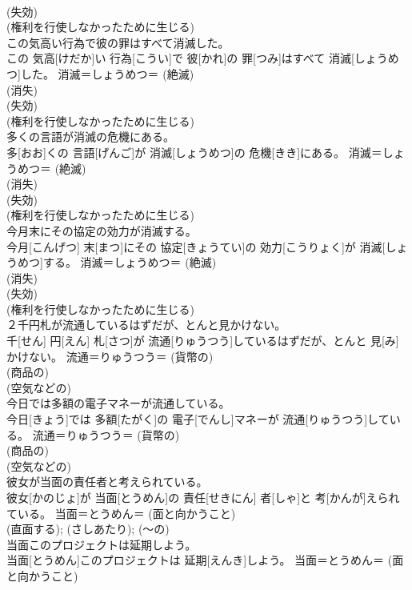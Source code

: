 \documentclass[8pt]{extreport}
\begin{document}
\begin{CJK}{UTF8}{min}
{\\	(失効) 
\\	(権利を行使しなかったために生じる) 
\\	この気高い行為で彼の罪はすべて消滅した。	
\\	この 気高[けだか]い 行為[こうい]で 彼[かれ]の 罪[つみ]はすべて 消滅[しょうめつ]した。	消滅＝しょうめつ＝ (絶滅) 
\\	(消失) 
\\	(失効) 
\\	(権利を行使しなかったために生じる) 
\\	多くの言語が消滅の危機にある。	
\\	多[おお]くの 言語[げんご]が 消滅[しょうめつ]の 危機[きき]にある。	消滅＝しょうめつ＝ (絶滅) 
\\	(消失) 
\\	(失効) 
\\	(権利を行使しなかったために生じる) 
\\	今月末にその協定の効力が消滅する。	
\\	今月[こんげつ] 末[まつ]にその 協定[きょうてい]の 効力[こうりょく]が 消滅[しょうめつ]する。	消滅＝しょうめつ＝ (絶滅) 
\\	(消失) 
\\	(失効) 
\\	(権利を行使しなかったために生じる) 
\\	２千円札が流通しているはずだが、とんと見かけない。	
\\	千[せん] 円[えん] 札[さつ]が 流通[りゅうつう]しているはずだが、とんと 見[み]かけない。	流通＝りゅうつう＝ (貨幣の) 
\\	(商品の) 
\\	(空気などの) 
\\	今日では多額の電子マネーが流通している。	
\\	今日[きょう]では 多額[たがく]の 電子[でんし]マネーが 流通[りゅうつう]している。	流通＝りゅうつう＝ (貨幣の) 
\\	(商品の) 
\\	(空気などの) 
\\	彼女が当面の責任者と考えられている。	
\\	彼女[かのじょ]が 当面[とうめん]の 責任[せきにん] 者[しゃ]と 考[かんが]えられている。	当面＝とうめん＝ (面と向かうこと) 
\\	(直面する); (さしあたり); (〜の) 
\\	当面このプロジェクトは延期しよう。	
\\	当面[とうめん]このプロジェクトは 延期[えんき]しよう。	当面＝とうめん＝ (面と向かうこと) 
}
\end{CJK}
\end{document}
